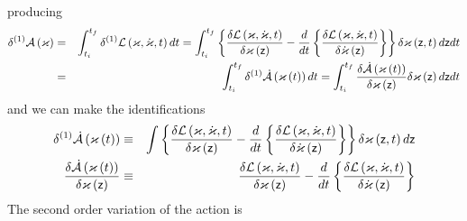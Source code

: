 producing 
\begin{eqnarray}
\delta ^{\left( 1\right) }{\cal A}\left( \varkappa \right)
&=&\int_{t_{i}}^{t_{f}}\delta ^{\left( 1\right) }{\cal L}\left( \varkappa ,%
\dot{\varkappa},t\right) dt=\int_{t_{i}}^{t_{f}}\left\{ \frac{\delta {\cal L}%
\left( {\cal \varkappa },{\cal \dot{\varkappa}},t\right) }{\delta {\cal %
\varkappa }\left( {\sf z}\right) }-\frac{d}{dt}\left\{ \frac{\delta {\cal L}%
\left( {\cal \varkappa },{\cal \dot{\varkappa}},t\right) }{\delta {\cal \dot{%
\varkappa}}\left( {\sf z}\right) }\right\} \right\} \delta \varkappa \left( 
{\sf z},t\right) d{\sf z}dt  \nonumber \\
&=&\int_{t_{i}}^{t_{f}}\delta ^{\left( 1\right) }{\cal \dot{A}}\left(
\varkappa \left( t\right) \right) dt=\int_{t_{i}}^{t_{f}}\frac{\delta {\cal 
\dot{A}}\left( \varkappa \left( t\right) \right) }{\delta \varkappa \left( 
{\sf z}\right) }\delta \varkappa \left( {\sf z}\right) d{\sf z}dt
\end{eqnarray}%
and we can make the identifications 
\begin{eqnarray}
\delta ^{\left( 1\right) }{\cal \dot{A}}\left( \varkappa \left( t\right)
\right) &\equiv &\int \left\{ \frac{\delta {\cal L}\left( {\cal \varkappa },%
{\cal \dot{\varkappa}},t\right) }{\delta {\cal \varkappa }\left( {\sf z}%
\right) }-\frac{d}{dt}\left\{ \frac{\delta {\cal L}\left( {\cal \varkappa },%
{\cal \dot{\varkappa}},t\right) }{\delta {\cal \dot{\varkappa}}\left( {\sf z}%
\right) }\right\} \right\} \delta \varkappa \left( {\sf z},t\right) d{\sf z}
\nonumber \\
\frac{\delta {\cal \dot{A}}\left( \varkappa \left( t\right) \right) }{\delta
\varkappa \left( {\sf z}\right) } &\equiv &\frac{\delta {\cal L}\left( {\cal %
\varkappa },{\cal \dot{\varkappa}},t\right) }{\delta {\cal \varkappa }\left( 
{\sf z}\right) }-\frac{d}{dt}\left\{ \frac{\delta {\cal L}\left( {\cal %
\varkappa },{\cal \dot{\varkappa}},t\right) }{\delta {\cal \dot{\varkappa}}%
\left( {\sf z}\right) }\right\}  \label{D1A}
\end{eqnarray}%
The second order variation of the action is 
